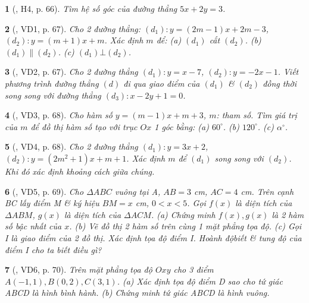 \documentclass{article}
\newtheorem{baitoan}{}
\begin{document}
\begin{baitoan}[\cite{Binh_boi_duong_Toan_9_tap_1}, H4, p. 66]
	Tìm hệ số góc của đường thẳng $5x + 2y = 3$.
\end{baitoan}

\begin{baitoan}[\cite{Binh_boi_duong_Toan_9_tap_1}, VD1, p. 67]
	Cho 2 đường thẳng: $(d_1):y = (2m - 1)x + 2m - 3$, $(d_2):y = (m + 1)x + m$. Xác định $m$ để: (a) $(d_1)$ cắt $(d_2)$. (b) $(d_1)\parallel(d_2)$. (c) $(d_1)\bot(d_2)$.
\end{baitoan}

\begin{baitoan}[\cite{Binh_boi_duong_Toan_9_tap_1}, VD2, p. 67]
	Cho 2 đường thẳng $(d_1):y = x - 7$, $(d_2):y = -2x - 1$. Viết phương trình đường thẳng $(d)$ đi qua giao điểm của $(d_1)$ \& $(d_2)$ đồng thời song song với đường thẳng $(d_3):x - 2y + 1 = 0$.
\end{baitoan}

\begin{baitoan}[\cite{Binh_boi_duong_Toan_9_tap_1}, VD3, p. 68]
	Cho hàm số $y = (m - 1)x + m + 3$, $m$: tham số. Tìm giá trị của $m$ để đồ thị hàm số tạo với trục $Ox$ 1 góc bằng: (a) $60^\circ$. (b) $120^\circ$. (c) $\alpha^\circ$.
\end{baitoan}

\begin{baitoan}[\cite{Binh_boi_duong_Toan_9_tap_1}, VD4, p. 68]
	Cho 2 đường thẳng $(d_1):y = 3x + 2$, $(d_2):y = (2m^2 + 1)x + m + 1$. Xác định $m$ để $(d_1)$ song song với $(d_2)$. Khi đó xác định khoảng cách giữa chúng.
\end{baitoan}

\begin{baitoan}[\cite{Binh_boi_duong_Toan_9_tap_1}, VD5, p. 69]
	Cho $\Delta ABC$ vuông tại A, $AB = 3$ {\rm cm}, $AC = 4$ {\rm cm}. Trên cạnh BC lấy điểm M \& ký hiệu $BM = x$ {\rm cm}, $0 < x < 5$. Gọi $f(x)$ là diện tích của $\Delta ABM$, $g(x)$ là diện tích của $\Delta ACM$. (a) Chứng minh $f(x),g(x)$ là 2 hàm số bậc nhất của $x$. (b) Vẽ đồ thị 2 hàm số trên cùng 1 mặt phẳng tọa độ. (c) Gọi I là giao điểm của 2 đồ thị. Xác định tọa độ điểm I. Hoành độbiết \& tung độ của điểm I cho ta biết điều gì?
\end{baitoan}

\begin{baitoan}[\cite{Binh_boi_duong_Toan_9_tap_1}, VD6, p. 70]
	Trên mặt phẳng tọa độ $Oxy$ cho 3 điểm $A(-1,1),B(0,2),C(3,1)$. (a) Xác định tọa độ điểm D sao cho tứ giác ABCD là hình bình hành. (b) Chứng minh tứ giác ABCD là hình vuông.
\end{baitoan}
\end{document}
